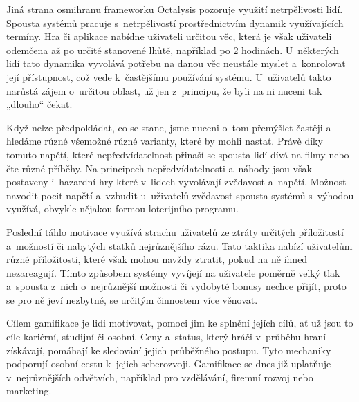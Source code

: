\documentclass[12pt]{article}
\begin{document}
Jiná strana osmihranu frameworku Octalysis pozoruje využití
netrpělivosti lidí. Spousta systémů pracuje s~netrpělivostí
prostřednictvím dynamik využívajících termíny. 
Hra či aplikace nabídne uživateli určitou věc, která je však uživateli 
odemčena až po určité stanovené lhůtě, například po 2 hodinách.
U~některých lidí tato dynamika vyvolává potřebu na danou věc neustále myslet
a~konrolovat její přístupnost, což vede k~častějšímu používání systému.
U~uživatelů takto narůstá zájem o~určitou oblast, už jen z~principu,
že byli na ni nuceni tak „dlouho“ čekat.

Když nelze předpokládat, co se stane, jsme nuceni o~tom přemýšlet častěji a~
hledáme různé všemožné různé varianty, které by mohli nastat.
Právě díky tomuto napětí, které nepředvídatelnost přinaší se spousta lidí 
dívá na filmy nebo čte různé příběhy. 
Na principech nepředvídatelnosti a~náhody jsou však postaveny i~hazardní hry
které v~lidech vyvolávají zvědavost a~napětí.
Možnost navodit pocit napětí a~vzbudit u~uživatelů zvědavost spousta systémů
s~výhodou využívá, obvykle nějakou formou loterijního programu.

Poslední táhlo motivace využívá strachu uživatelů ze ztráty určitých příložitostí 
a~možností či nabytých statků nejrůznějšího rázu. 
Tato taktika nabízí uživatelům různé příložitosti, které však mohou navždy ztratit,
pokud na ně ihned nezareagují. 
Tímto způsobem systémy vyvíjejí na uživatele poměrně velký tlak
a~spousta z~nich o~nejrůznější možnosti či vydobyté bonusy nechce přijít,
proto se pro ně jeví nezbytné, se určitým činnostem více věnovat.


Cílem gamifikace je lidi motivovat, 
pomoci jim ke splnění jejích cílů, ať už jsou to cíle kariérní, studijní či osobní.
Ceny a~status, který hráči v~průběhu hraní získávají,
 pomáhají ke sledování jejich průběžného postupu.
Tyto mechaniky podporují osobní cestu k~jejich seberozvoji. 
Gamifikace se dnes již uplatňuje v~nejrůznějších odvětvích,
 například pro vzdělávání, firemní rozvoj nebo marketing.



\end{document}
